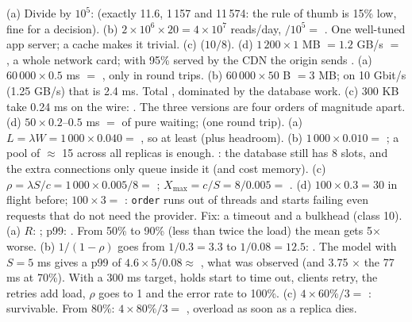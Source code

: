  (a) Divide by $10^5$:  (exactly 11.6, 1\,157 and 11\,574: the rule of thumb is 15\% low, fine for a decision). (b) $2 \times 10^6 \times 20 = 4 \times 10^7$ reads/day, $/10^5 =$ . One well-tuned app server; a cache makes it trivial. (c)  ($10/8$). (d) $1\,200 \times 1$ MB $= 1.2$ GB/s $=$ , a whole network card; with 95\% served by the CDN the origin sends .
 (a) $60\,000 \times 0.5$ ms $=$ , only in round trips. (b) $60\,000 \times 50$ B $= 3$ MB; on 10 Gbit/s (1.25 GB/s) that is 2.4 ms. Total , dominated by the database work. (c) 300 KB take 0.24 ms on the wire: . The three versions are four orders of magnitude apart. (d) $50 \times 0.2$--$0.5$ ms $=$  of pure waiting;  (one round trip).
 (a) $L = \lambda W = 1\,000 \times 0.040 =$ , so at least  (plus headroom). (b) $1\,000 \times 0.010 =$ ; a pool of $\approx$ 15 across all replicas is enough. : the database still has 8 slots, and the extra connections only queue inside it (and cost memory). (c) $\rho = \lambda S / c = 1\,000 \times 0.005 / 8 =$ ; $X_{\max} = c/S = 8/0.005 =$ . (d) $100 \times 0.3 = 30$ in flight before; $100 \times 3 =$ : \texttt{order} runs out of threads and starts failing even requests that do not need the provider. Fix: a timeout and a bulkhead (class 10).
 (a) $R$: ; p99: . From 50\% to 90\% (less than twice the load) the mean gets 5$\times$ worse. (b) $1/(1-\rho)$ goes from $1/0.3 = 3.3$ to $1/0.08 = 12.5$: . The model with $S = 5$ ms gives a p99 of $4.6 \times 5/0.08 \approx$ , what was observed (and 3.75 $\times$ the 77 ms at 70\%). With a 300 ms target, holds start to time out, clients retry, the retries add load, $\rho$ goes to 1 and the error rate to 100\%. (c) $4 \times 60\% / 3 =$ : survivable. From 80\%: $4 \times 80\%/3 =$ , overload as soon as a replica dies.
